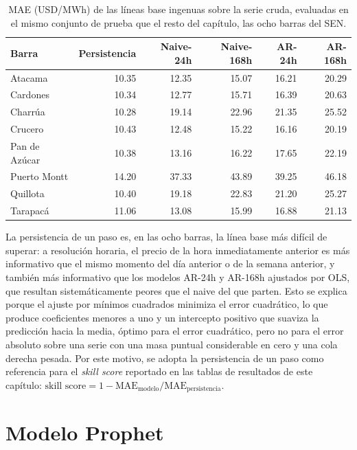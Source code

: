 \begin{table}[htbp]
    \centering
    \small
    \begin{tabular}{lrrrrr}
        \toprule
        Barra & Persistencia & Naive-24h & Naive-168h & AR-24h & AR-168h \\
        \midrule
        Atacama       & 10.35 & 12.35 & 15.07 & 16.21 & 20.29 \\
        Cardones      & 10.34 & 12.77 & 15.71 & 16.39 & 20.63 \\
        Charrúa       & 10.28 & 19.14 & 22.96 & 21.35 & 25.52 \\
        Crucero       & 10.43 & 12.48 & 15.22 & 16.16 & 20.19 \\
        Pan de Azúcar & 10.38 & 13.16 & 16.22 & 17.65 & 22.19 \\
        Puerto Montt  & 14.20 & 37.33 & 43.89 & 39.25 & 46.18 \\
        Quillota      & 10.40 & 19.18 & 22.83 & 21.20 & 25.27 \\
        Tarapacá      & 11.06 & 13.08 & 15.99 & 16.88 & 21.13 \\
        \bottomrule
    \end{tabular}
    \caption{MAE (USD/MWh) de las líneas base ingenuas sobre la serie cruda, evaluadas en el mismo conjunto de prueba que el resto del capítulo, las ocho barras del SEN.}
    \label{tab:baselines_naive}
\end{table}

La persistencia de un paso es, en las ocho barras, la línea base más difícil de superar: a resolución horaria, el precio de la hora inmediatamente anterior es más informativo que el mismo momento del día anterior o de la semana anterior, y también más informativo que los modelos AR-24h y AR-168h ajustados por OLS, que resultan sistemáticamente peores que el naive del que parten. Esto se explica porque el ajuste por mínimos cuadrados minimiza el error cuadrático, lo que produce coeficientes menores a uno y un intercepto positivo que suaviza la predicción hacia la media, óptimo para el error cuadrático, pero no para el error absoluto sobre una serie con una masa puntual considerable en cero y una cola derecha pesada. Por este motivo, se adopta la persistencia de un paso como referencia para el \textit{skill score} reportado en las tablas de resultados de este capítulo: $\text{skill score} = 1 - \text{MAE}_{\text{modelo}} / \text{MAE}_{\text{persistencia}}$.

\section{Modelo Prophet}
\label{sec:prophet_truncamiento_pipeline}
\label{sec:modelo_prophet}

